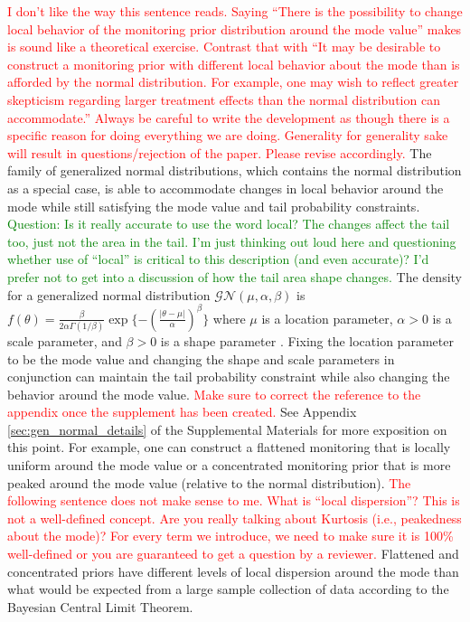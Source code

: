 \documentclass[useAMS,usenatbib,referee]{biom}
\begin{document}
\textcolor{red}{I don't like the way this sentence reads. Saying ``There is the possibility to change local behavior of the monitoring prior distribution around the mode value'' makes is sound like a theoretical exercise. Contrast that with ``It may be  desirable to construct a monitoring prior with different local behavior about the mode than is afforded by the normal distribution. For example, one may wish to reflect greater skepticism regarding larger treatment effects than the normal distribution can accommodate.'' Always be careful to write the development as though there is a specific reason for doing everything we are doing. Generality for generality sake will result in questions/rejection of the paper. Please revise accordingly.}
%
The family of generalized normal distributions, which contains the normal distribution as a special case, is able to accommodate changes in local behavior around the mode while still satisfying the mode value and tail probability constraints. 
\textcolor{green}{Question: Is it really accurate to use the word local? The changes affect the tail too, just not the area in the tail. 
%
I'm just thinking out loud here and questioning
whether use of ``local'' is critical to this description (and even accurate)? 
%
I'd prefer not to get into a discussion of how the tail area shape changes.}
%
The density for a generalized normal distribution $\mathcal{GN}(\mu,\alpha,\beta)$ is
$
f(\theta)=\frac{\beta}{2\alpha\Gamma(1/\beta)}\exp\{-(\frac{|\theta-\mu|}{\alpha})^\beta\}
$ where $\mu$ is a location parameter, $\alpha>0$ is a scale parameter, and $\beta>0$ is a shape parameter \citep{Nadarajah2005}. Fixing the location parameter to be the mode value and changing the shape and scale parameters in conjunction can maintain the tail probability constraint while also changing the behavior around the mode value.
%
\textcolor{red}{Make sure to correct the reference to the appendix once the supplement has been created.}
See Appendix \ref{sec:gen_normal_details} of the Supplemental Materials for more exposition on this point. 
%
For example, one can construct a flattened monitoring that is locally uniform around the mode value or a 
concentrated monitoring prior that is more peaked around the mode value (relative to the normal distribution). 
%
\textcolor{red}{The following sentence does not make sense to me. What is ``local dispersion''? This is not a well-defined concept. 
Are you really talking about Kurtosis (i.e., peakedness about the mode)? For every term we introduce, we need to make sure it is 
100\% well-defined or you are guaranteed to get a question by a reviewer.}
%
Flattened and concentrated priors have different levels of local dispersion around the mode than 
what would be expected from a large sample collection of data according to the Bayesian Central Limit Theorem.
\end{document}
